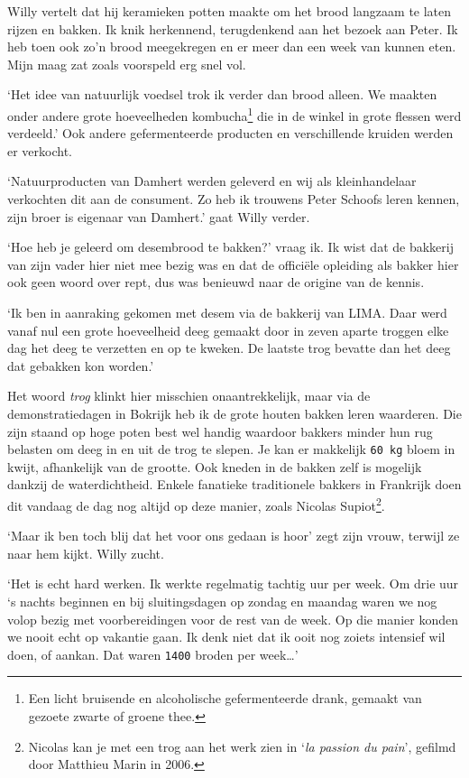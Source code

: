 \documentclass[
  11pt,
  dutch,
]{memoir}
\begin{document}
Willy vertelt dat hij keramieken potten maakte om het brood langzaam te
laten rijzen en bakken. Ik knik herkennend, terugdenkend aan het bezoek
aan Peter. Ik heb toen ook zo'n brood meegekregen en er meer dan een
week van kunnen eten. Mijn maag zat zoals voorspeld erg snel vol.~

`Het idee van natuurlijk voedsel trok ik verder dan brood alleen. We
maakten onder andere grote hoeveelheden kombucha\footnote{Een licht
  bruisende en alcoholische gefermenteerde drank, gemaakt van gezoete
  zwarte of groene thee.} die in de winkel in grote flessen werd
verdeeld.' Ook andere gefermenteerde producten en verschillende kruiden
werden er verkocht.

`Natuurproducten van Damhert werden geleverd en wij als kleinhandelaar
verkochten dit aan de consument. Zo heb ik trouwens Peter Schoofs leren
kennen, zijn broer is eigenaar van Damhert.' gaat Willy verder.

`Hoe heb je geleerd om desembrood te bakken?' vraag ik. Ik wist dat de
bakkerij van zijn vader hier niet mee bezig was en dat de officiële
opleiding als bakker hier ook geen woord over rept, dus was benieuwd
naar de origine van de kennis.

`Ik ben in aanraking gekomen met desem via de bakkerij van LIMA. Daar
werd vanaf nul een grote hoeveelheid deeg gemaakt door in zeven aparte
troggen elke dag het deeg te verzetten en op te kweken. De laatste trog
bevatte dan het deeg dat gebakken kon worden.'

Het woord \emph{trog} klinkt hier misschien onaantrekkelijk, maar via de
demonstratiedagen in Bokrijk heb ik de grote houten bakken leren
waarderen. Die zijn staand op hoge poten best wel handig waardoor
bakkers minder hun rug belasten om deeg in en uit de trog te slepen. Je
kan er makkelijk \texttt{60\ kg} bloem in kwijt, afhankelijk van de
grootte. Ook kneden in de bakken zelf is mogelijk dankzij de
waterdichtheid. Enkele fanatieke traditionele bakkers in Frankrijk doen
dit vandaag de dag nog altijd op deze manier, zoals Nicolas
Supiot\footnote{Nicolas kan je met een trog aan het werk zien in
  `\emph{la passion du pain}', gefilmd door Matthieu Marin in 2006.}.

`Maar ik ben toch blij dat het voor ons gedaan is hoor' zegt zijn vrouw,
terwijl ze naar hem kijkt. Willy zucht.

`Het is echt hard werken. Ik werkte regelmatig tachtig uur per week. Om
drie uur `s nachts beginnen en bij sluitingsdagen op zondag en maandag
waren we nog volop bezig met voorbereidingen voor de rest van de week.
Op die manier konden we nooit echt op vakantie gaan. Ik denk niet dat ik
ooit nog zoiets intensief wil doen, of aankan. Dat waren \texttt{1400}
broden per week\ldots{}'
\end{document}
